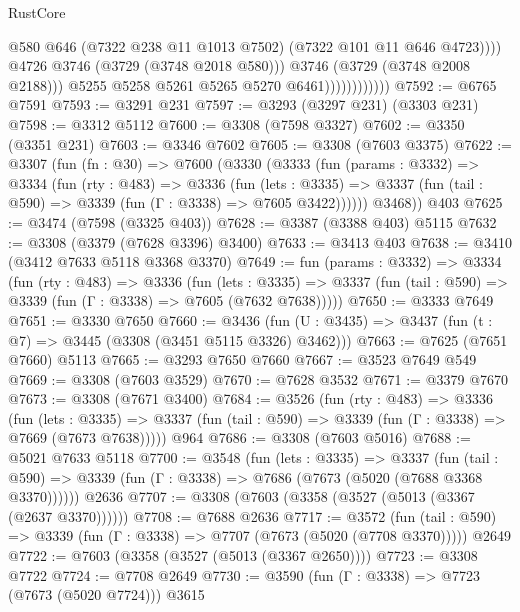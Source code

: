 \begin{lexlean}{RustCore}
\begin{coremodule}
                                      @580
                                      @646
                                      (@7322 @238 @11 @1013 @7502)
                                      (@7322 @101 @11 @646 @4723))))
                                @4726
                                @3746
                                (@3729 (@3748 @2018 @580)))
                              @3746
                              (@3729 (@3748 @2008 @2188)))
                            @5255
                            @5258
                            @5261
                            @5265
                            @5270
                            @6461))))))))))))
@7592 := @6765 @7591
@7593 := @3291 @231
@7597 := @3293 (@3297 @231) (@3303 @231)
@7598 := @3312 @5112
@7600 := @3308 (@7598 @3327)
@7602 := @3350 (@3351 @231)
@7603 := @3346 @7602
@7605 := @3308 (@7603 @3375)
@7622 := @3307
    (fun (fn : @30) =>
    @7600
      (@3330
        (@3333
          (fun (params : @3332) =>
          @3334
            (fun (rty : @483) =>
            @3336
              (fun (lets : @3335) =>
              @3337 (fun (tail : @590) => @3339 (fun (Γ : @3338) => @7605 @3422))))))
        @3468))
    @403
@7625 := @3474 (@7598 (@3325 @403))
@7628 := @3387 (@3388 @403) @5115
@7632 := @3308 (@3379 (@7628 @3396) @3400)
@7633 := @3413 @403
@7638 := @3410 (@3412 @7633 @5118 @3368 @3370)
@7649 := fun (params : @3332) =>
  @3334
    (fun (rty : @483) =>
    @3336
      (fun (lets : @3335) =>
      @3337 (fun (tail : @590) => @3339 (fun (Γ : @3338) => @7605 (@7632 @7638)))))
@7650 := @3333 @7649
@7651 := @3330 @7650
@7660 := @3436 (fun (U : @3435) => @3437 (fun (t : @7) => @3445 (@3308 (@3451 @5115 @3326) @3462)))
@7663 := @7625 (@7651 @7660) @5113
@7665 := @3293 @7650 @7660
@7667 := @3523 @7649 @549
@7669 := @3308 (@7603 @3529)
@7670 := @7628 @3532
@7671 := @3379 @7670
@7673 := @3308 (@7671 @3400)
@7684 := @3526
    (fun (rty : @483) =>
    @3336
      (fun (lets : @3335) =>
      @3337 (fun (tail : @590) => @3339 (fun (Γ : @3338) => @7669 (@7673 @7638)))))
    @964
@7686 := @3308 (@7603 @5016)
@7688 := @5021 @7633 @5118
@7700 := @3548
    (fun (lets : @3335) =>
    @3337
      (fun (tail : @590) => @3339 (fun (Γ : @3338) => @7686 (@7673 (@5020 (@7688 @3368 @3370))))))
    @2636
@7707 := @3308 (@7603 (@3358 (@3527 (@5013 (@3367 (@2637 @3370))))))
@7708 := @7688 @2636
@7717 := @3572
    (fun (tail : @590) => @3339 (fun (Γ : @3338) => @7707 (@7673 (@5020 (@7708 @3370)))))
    @2649
@7722 := @7603 (@3358 (@3527 (@5013 (@3367 @2650))))
@7723 := @3308 @7722
@7724 := @7708 @2649
@7730 := @3590 (fun (Γ : @3338) => @7723 (@7673 (@5020 @7724))) @3615

\end{coremodule}
\end{lexlean}
